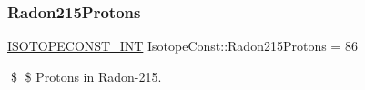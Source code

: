 \subsubsection{\texorpdfstring{Radon215\+Protons}{Radon215Protons}}
{\footnotesize\ttfamily \mbox{\hyperlink{group___isotope_const-_macros_ga5f18360b3e99483a35c32d789e62621c}{I\+S\+O\+T\+O\+P\+E\+C\+O\+N\+S\+T\+\_\+\+I\+NT}} Isotope\+Const\+::\+Radon215\+Protons = 86}

\$ \$ Protons in Radon-\/215. 